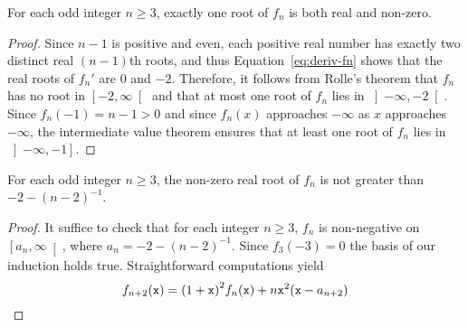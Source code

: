  \begin{theorem}
   For each odd integer $n \ge 3$,
   exactly one root of $f_n$ is both real and non-zero.
 \end{theorem}

 \begin{proof}
   Since $n - 1$ is positive and even,
   each positive real number has exactly two distinct real $(n - 1)$th roots,
   and thus Equation~\eqref{eq:deriv-fn} shows that the real roots of $f_n'$ are $0$ and $- 2$.
   Therefore, it follows from Rolle's theorem that
   $f_n$ has no root in $\left[- 2, \infty \right[$
   and that
   at most one root of $f_n$ lies in $\left]- \infty, - 2 \right[$.
   Since $f_n(-1) = n - 1 > 0$ and since $f_n(x)$ approaches $- \infty$ as $x$ approaches $- \infty$,
   the intermediate value theorem ensures that at least one root of $f_n$ lies in $\left]- \infty, -1 \right]$.
 \end{proof}




 \begin{theorem}
   For each odd integer $n \ge 3$,
   the non-zero real root of $f_n$ is not greater than $- 2 - {(n - 2)}^{- 1}$.
 \end{theorem}

 \begin{proof}
   It suffice to check that for each integer $n \ge 3$,
    $f_n$ is non-negative on $\left[a_n, \infty \right[$,
    where $a_n = - 2 - {(n - 2)}^{- 1}$.
    Since $f_3(- 3) = 0$ the basis of our induction holds true.
    Straightforward computations yield 
    $$
    f_{n + 2} (\mathtt{x}) = {(1 + \mathtt{x})}^2 f_n(\mathtt{x}) + n \mathtt{x}^2 (\mathtt{x} - a_{n + 2}) 
    $$
   
 \end{proof} 
 
 

